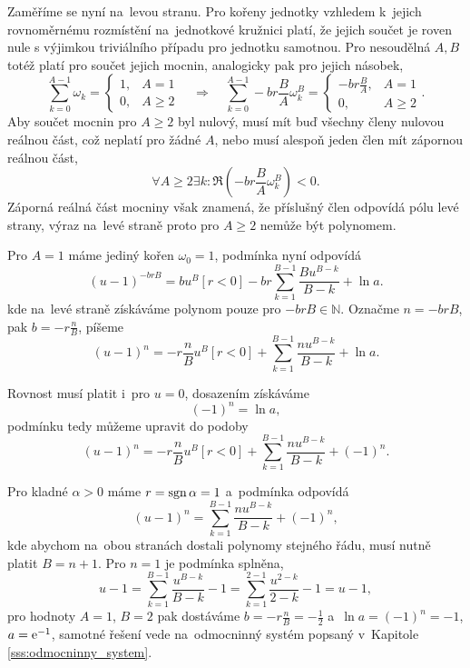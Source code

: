 Zaměříme se nyní na~levou stranu. Pro kořeny jednotky vzhledem k~jejich rovnoměrnému rozmístění na~jednotkové kružnici platí, že jejich součet je roven nule s výjimkou triviálního případu pro jednotku samotnou. Pro nesoudělná $A,B$ totéž platí pro součet jejich mocnin, analogicky pak pro jejich násobek,
\begin{equation}
    \sum_{k=0}^{A-1}\omega_k=\begin{cases}1,& A=1\\0,&A\ge2\end{cases}\quad \Longrightarrow \quad \sum_{k=0}^{A-1}-br\frac{B}{A}\omega_k^B=\begin{cases}-br\frac{B}{A},& A=1\\0,&A\ge2\end{cases}.
\end{equation}
Aby součet mocnin pro $A\ge2$ byl nulový, musí mít buď všechny členy nulovou reálnou část, což neplatí pro žádné $A$, nebo musí alespoň jeden člen mít zápornou reálnou část,
\begin{equation}
    \forall A\ge2 \exists k:\Re\left(-br\frac{B}{A}\omega_k^B\right)<0.
\end{equation}
Záporná reálná část mocniny však znamená, že příslušný člen odpovídá pólu levé strany, výraz na~levé straně proto pro $A\ge2$ nemůže být polynomem. 

Pro $A=1$ máme jediný kořen $\omega_0=1$, podmínka  nyní odpovídá
\begin{equation}
    (u-1)^{-brB}=bu^B[r<0]-br\sum_{k=1}^{B-1}\frac{Bu^{B-k}}{B-k}+\ln a.
\end{equation}
kde na~levé straně získáváme polynom pouze pro $-brB\in\mathbb{N}$. Označme $n=-brB$, pak $b=-r\frac{n}{B}$, píšeme
\begin{equation}
    (u-1)^n=-r\frac{n}{B}u^B[r<0]+\sum_{k=1}^{B-1}\frac{nu^{B-k}}{B-k}+\ln a.
\end{equation}

Rovnost musí platit i~pro $u=0$, dosazením získáváme
\begin{equation}
    (-1)^n=\ln a,
\end{equation}
podmínku tedy můžeme upravit do podoby 
\begin{equation}
    (u-1)^n=-r\frac{n}{B}u^B[r<0]+\sum_{k=1}^{B-1}\frac{nu^{B-k}}{B-k}+(-1)^n.
\end{equation}

Pro kladné $\alpha>0$ máme $r=\operatorname{sgn}{\alpha}=1$ a~podmínka odpovídá 
\begin{equation}
    (u-1)^n=\sum_{k=1}^{B-1}\frac{nu^{B-k}}{B-k}+(-1)^n,
\end{equation}
kde abychom na~obou stranách dostali polynomy stejného řádu, musí nutně platit $B=n+1$. Pro $n=1$ je podmínka splněna,
\begin{equation}
    u-1=\sum_{k=1}^{B-1}\frac{u^{B-k}}{B-k}-1=\sum_{k=1}^{2-1}\frac{u^{2-k}}{2-k}-1=u-1,
\end{equation}
pro hodnoty $A=1$, $B=2$ pak dostáváme $b=-r\frac{n}{B}=-\frac{1}{2}$ a~$\ln a=(-1)^n=-1$, $a=\mathrm{e}^{-1}$, samotné řešení vede na~odmocninný systém popsaný v~Kapitole \ref{sss:odmocninny_system}.

